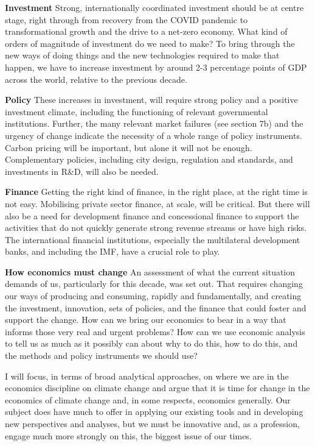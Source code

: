 \documentclass[
]{book}
\begin{document}
\textbf{Investment}
Strong, internationally coordinated investment should be at centre stage,
right through from recovery from the COVID pandemic to transformational growth and
the drive to a net-zero economy.
What kind of orders of magnitude of investment do we need to make? To bring
through the new ways of doing things and the new technologies required to make
that happen, we have to increase investment by around 2-3 percentage points of GDP
across the world, relative to the previous decade.

\textbf{Policy}
These increases in investment, will require strong policy and a positive investment climate, including
the functioning of relevant governmental institutions. Further, the many relevant market failures (see
section 7b) and the urgency of change indicate the necessity of a whole range of policy instruments.
Carbon pricing will be important, but alone it will not be enough. Complementary policies, including city
design, regulation and standards, and investments in R\&D, will also be needed.

\textbf{Finance}
Getting the right kind of finance, in the right place, at the right time is not easy. Mobilising private
sector finance, at scale, will be critical. But there will also be a need for development finance and
concessional finance to support the activities that do not quickly generate strong revenue streams or
have high risks. The international financial institutions, especially the multilateral development banks,
and including the IMF, have a crucial role to play.

\textbf{How economics must change}
An assessment of what the current situation demands of us, particularly for this decade, was set out. That requires changing our ways of producing and consuming, rapidly and fundamentally, and
creating the investment, innovation, sets of policies, and the finance that could foster and support the
change. How can we bring our economics to bear in a way that informs those very real and urgent
problems? How can we use economic analysis to tell us as much as it possibly can about why to do
this, how to do this, and the methods and policy instruments we should use?

I will focus,
in terms of broad analytical approaches, on where we are in the economics discipline on climate change
and argue that it is time for change in the economics of climate change and, in some respects,
economics generally.
Our subject does have much to offer in
applying our existing tools and in developing new perspectives and analyses, but we must be innovative
and, as a profession, engage much more strongly on this, the biggest issue of our times.
\end{document}
